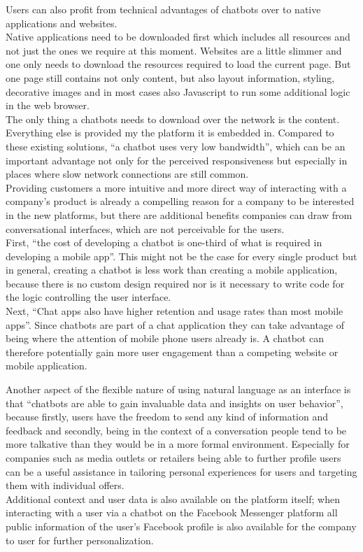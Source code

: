 Users can also profit from technical advantages of chatbots over to native applications and websites.
\\
Native applications need to be downloaded first which includes all resources and not just the ones we require at this moment.
Websites are a little slimmer and one only needs to download the resources required to load the current page.
But one page still contains not only content, but also layout information, styling, decorative images and in most cases also Javascript to run some additional logic in the web browser.
\\
The only thing a chatbots needs to download over the network is the content. Everything else is provided my the platform it is embedded in.
Compared to these existing solutions, ``a chatbot uses very low bandwidth''\cite{techinasia}, which can be an important advantage not only for the perceived responsiveness but especially in places where slow network connections are still common.
\\

Providing customers a more intuitive and more direct way of interacting with a company's product is already a compelling reason for a company to be interested in the new platforms, but there are additional benefits companies can draw from conversational interfaces, which are not perceivable for the users.
\\

First, ``the cost of developing a chatbot is one-third of what is required in developing a mobile app''\cite{techinasia}. This might not be the case for every single product but in general, creating a chatbot is less work than creating a mobile application, because there is no custom design required nor  is it necessary to write code for the logic controlling the user interface.
\\

Next, ``Chat apps also have higher retention and usage rates than most mobile apps''\cite{businessinsider}. Since chatbots are part of a chat application they can take advantage of being where the attention of mobile phone users already is. A chatbot can therefore potentially gain more user engagement than a competing website or mobile application.

Another aspect of the flexible nature of using natural language as an interface is that ``chatbots are able to gain invaluable data and insights on user behavior''\cite{drum}, because firstly, users have the freedom to send any kind of information and feedback and secondly, being in the context of a conversation people tend to be more talkative than they would be in a more formal environment.
Especially for companies such as media outlets or retailers being able to further profile users can be a useful assistance in tailoring personal experiences for users and targeting them with individual offers.
\\
Additional context and user data is also available on the platform itself; when interacting with a user via a chatbot on the Facebook Messenger platform all public information of the user's Facebook profile is also available for the company to user for further personalization.
\\

